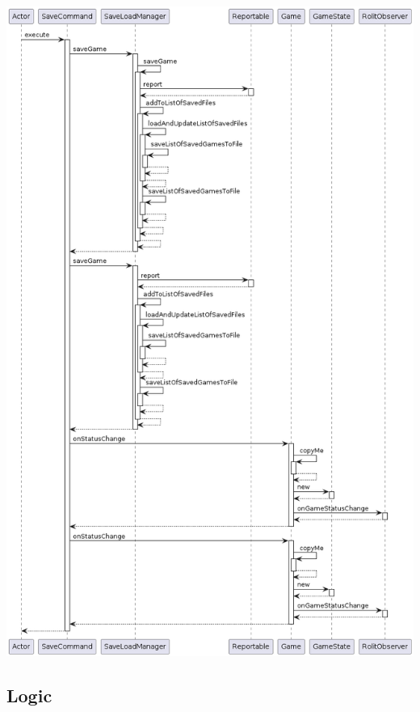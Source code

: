 \documentclass[../DocumentoOficial.tex]{subfiles}
\begin{document}
\newpage

\begin{center}
\includegraphics[scale=0.50]{SaveCommand_execute_final.png}
\end{center}

\newpage

\subsection{Logic}
\end{document}
